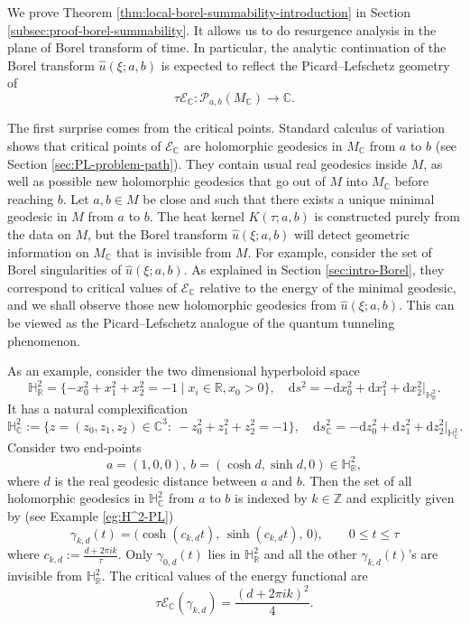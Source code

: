 \documentclass[11pt]{amsart}
\theoremstyle{plain}
\theoremstyle{definition}
\newcommand{\R}{\mathbb{R}}
\newcommand{\C}{\mathbb{C}}
\newcommand{\Z}{\mathbb Z}
\newcommand{\dd}{\mathrm d}
\newcommand{\PP}{\mathcal{P}}
\newcommand{\HH}{\mathbb{H}}
\begin{document}
We prove Theorem \ref{thm:local-borel-summability-introduction} in Section \ref{subsec:proof-borel-summability}. It allows us to do resurgence analysis in the plane of Borel transform of time. In particular, the analytic continuation of the Borel transform $\widehat u(\xi;a,b)$ is expected to reflect the Picard–Lefschetz geometry of
$$
\tau\mathcal E_{\C}: \PP_{a,b}(M_{\C})\to \C. 
$$

The first surprise comes from the critical points. Standard calculus of variation shows that critical points of $\mathcal E_{\C}$ are holomorphic geodesics in $M_{\C}$ from $a$ to $b$ (see Section \ref{sec:PL-problem-path}). They contain usual real geodesics inside $M$, as well as possible new holomorphic geodesics that go out of $M$ into $M_{\C}$ before reaching $b$. Let $a,b\in M$ be close and such that there exists a unique minimal geodesic in $M$ from $a$ to $b$.  The heat kernel $K(\tau;a,b)$ is constructed purely from the data on $M$, but the Borel transform $\widehat u(\xi;a,b)$ will detect geometric information on $M_{\C}$ that is invisible from $M$. For example, consider the set of Borel singularities of $\widehat u(\xi;a,b)$. As explained in Section \ref{sec:intro-Borel}, they correspond to critical values of $\mathcal E_{\C}$ relative to the energy of the minimal geodesic, and we shall observe those new holomorphic geodesics from $\widehat u(\xi;a,b)$. This can be viewed as the Picard–Lefschetz analogue of the quantum tunneling phenomenon.


As an example, consider the two dimensional hyperboloid space
\[
\HH_{\R}^2=\{-x_0^2+x_1^2+x_2^2=-1\mid x_i\in\R, x_0>0\}, \quad \dd s^2=-\dd x_0^2+\dd x_1^2+\dd x_2^2\big|_{\HH_{\R}^2}.
\] 
It has a natural complexification 
\[
\HH_{\C}^2:=\bigl\{z=(z_0,z_1,z_2)\in \C^3:\ -z_0^2+z_1^2+z_2^2=-1\bigr\}, \quad \dd s^2_{\C}=-\dd z_0^2+\dd z_1^2+\dd z_2^2\big|_{\HH_{\C}^2}.
\]
Consider two end-points  
$$
a=(1,0,0),~ b=(\cosh d,\sinh d,0) \in \HH_{\R}^2,
$$ 
where $d$ is the real geodesic distance between $a$ and $b$. Then the set of all holomorphic geodesics in $\HH_{\C}^2$ from $a$ to $b$ is indexed by $k\in \Z$ and explicitly given by (see Example \ref{eg:H^2-PL})
\begin{equation*}
\gamma_{{k},d}(t)=\bigl(\cosh(c_{k,d}t),\,\sinh(c_{k,d}t),\,0\bigr),
\qquad 0\le t\le \tau
\end{equation*}
where $c_{k,d}:=\frac{d+2\pi i k}{\tau}$. Only $\gamma_{0,d}(t)$ lies in $\HH_{\R}^2$ and all the other $\gamma_{{k},d}(t)$'s are invisible from $\HH_{\R}^2$. The critical values of the energy functional are 
$$
\tau\mathcal E_{\C}(\gamma_{{k},d})=\frac{(d+2\pi i k)^2}{4}.
$$ 
\end{document}
